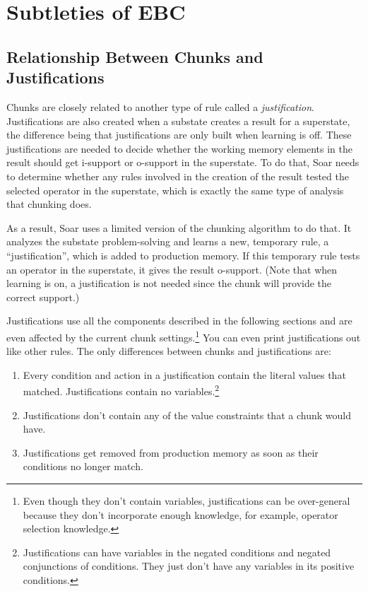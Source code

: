 \section{Subtleties of EBC}
\label{CHUNKING-subtleties}

\subsection{Relationship Between Chunks and Justifications}

Chunks are closely related to another type of rule called a \textit{justification}.  Justifications are also created when a substate creates a result for a superstate, the difference being that justifications are only built when learning is off.  These justifications are needed to decide whether the working memory elements in the result should get i-support or o-support in the superstate.  To do that, Soar needs to determine whether any rules involved in the creation of the result tested the selected operator in the superstate, which is exactly the same type of analysis that chunking does.

As a result, Soar uses a limited version of the chunking algorithm to do that.  It analyzes the substate problem-solving and learns a new, temporary rule, a ``justification'', which is added to production memory.  If this temporary rule tests an operator in the superstate, it gives the result o-support. (Note that when learning is on, a justification is not needed since the chunk will provide the correct support.)

Justifications use all the components described in the following sections and are even affected by the current chunk settings.\footnote{
	Even though they don't contain variables, justifications can be over-general because they don't incorporate enough knowledge, for example, operator selection knowledge.}
 You can even print justifications out like other rules.  The only differences between chunks and justifications are:

 \begin{enumerate}
	\item Every condition and action in a justification contain the literal values that matched.  Justifications contain no variables.\footnote{
		Justifications can have variables in the negated conditions and negated conjunctions of conditions.  They just don't have any variables in its positive conditions.}
	\item Justifications don't contain any of the value constraints that a chunk would have.
	\item Justifications get removed from production memory as soon as their conditions no longer match.
 \end{enumerate}

